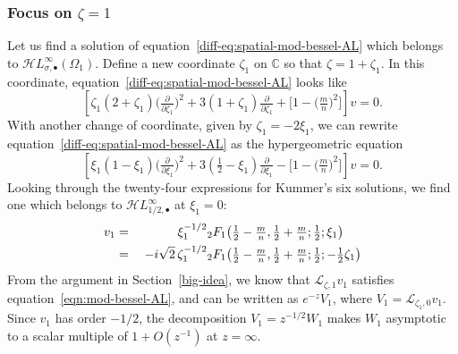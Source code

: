 \documentclass{article}
\newcommand{\singexp}[2]{\mathcal{H}L^\infty_{#1, #2}}
\newcommand{\singexpalg}[1]{\singexp{#1}{\bullet}}
\newcommand{\C}{\mathbb{C}}
\newcommand{\laplace}{\mathcal{L}}
\theoremstyle{definition}
\theoremstyle{plain}
\begin{document}
\subsubsection{Focus on $\zeta = 1$}\label{pos-root-AL}
Let us find a solution of equation~\eqref{diff-eq:spatial-mod-bessel-AL} which belongs to $\singexpalg{\sigma}(\Omega_1)$. Define a new coordinate $\zeta_1$ on $\C$ so that $\zeta = 1 + \zeta_1$. In this coordinate, equation~\eqref{diff-eq:spatial-mod-bessel-AL} looks like
\begin{equation}\label{diff-eq:spatial-mod-bessel-pos-AL}
\left[\zeta_1(2 + \zeta_1) \big(\tfrac{\partial}{\partial \zeta_1}\big)^2 + 3(1 + \zeta_1) \tfrac{\partial}{\partial \zeta_1} + \big[1 - \big(\tfrac{m}{n}\big)^2\big]\right] v = 0.
\end{equation}
With another change of coordinate, given by $\zeta_1 = -2\xi_1$, we can rewrite equation~\eqref{diff-eq:spatial-mod-bessel-AL} as the hypergeometric equation
\begin{equation}\label{diff-eq:hypergeom-pos-AL}
\left[\xi_1 (1 - \xi_1) \big(\tfrac{\partial}{\partial \xi_1}\big)^2 + 3(\tfrac{1}{2} - \xi_1) \tfrac{\partial}{\partial \xi_1} - \big[1 - \big(\tfrac{m}{n}\big)^2\big]\right] v = 0.
\end{equation}
Looking through the twenty-four expressions for Kummer's six solutions, we find one \cite[formula~15.10.12]{dlmf} which belongs to $\singexpalg{1/2}$ at $\xi_1 = 0$:
\begin{alignat*}{2}
v_1 &=\;& \hphantom{-i\sqrt{2}}\,\xi_1^{-1/2} & {}_2F_1\big(\tfrac{1}{2}-\tfrac{m}{n}, \tfrac{1}{2}+\tfrac{m}{n}; \tfrac{1}{2}; \xi_1\big) \\
&=\;& -i\sqrt{2}\,\zeta_1^{-1/2} & {}_2F_1\big(\tfrac{1}{2}-\tfrac{m}{n}, \tfrac{1}{2}+\tfrac{m}{n}; \tfrac{1}{2}; -\tfrac{1}{2}\zeta_1\big)
\end{alignat*}
From the argument in Section~\ref{big-idea}, we know that $\laplace_{\zeta, 1} v_1$ satisfies equation~\eqref{eqn:mod-bessel-AL}, and can be written as $e^{-z} V_1$, where $V_1 = \laplace_{\zeta_1, 0} v_1$. Since $v_1$ has order $-1/2$, the decomposition $V_1 = z^{-1/2} W_1$ makes $W_1$ asymptotic to a scalar multiple of $1+O(z^{-1})$ at $z = \infty$.
\end{document}
